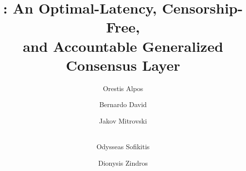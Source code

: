 \title{
  \podtm: An Optimal-Latency, Censorship-Free, \\and Accountable Generalized Consensus Layer
}
\ifanonymous{\iflncs
\fi}
\else
\author{
  Orestis Alpos\and
  Bernardo David\and
  Jakov Mitrovski\and\\
  Odysseas Sofikitis\and
  Dionysis Zindros
}
\iflncs
{}
\else
\affiliation{
\institution{
}
}
\fi
\fi

